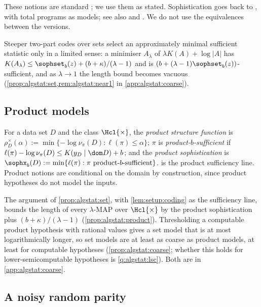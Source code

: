 These notions are standard \citep{gacs2001algorithmic,vereshchagin2004kolmogorov,vereshchagin2017algorithmic}; we use them as stated. Sophistication goes back to \citet{koppel1987complexity,koppel1991almost}, with total programs as models; see also \citet{vitanyi2006meaningful} and \citet{antunes2009sophistication}. We do not use the equivalences between the versions.

Steeper two-part codes over sets select an approximately minimal sufficient statistic only in a limited sense: a minimiser $A_\lambda$ of $\lambda K(A)+\log|A|$ has $K(A_\lambda)\le\sophset_b(z)+(b+\kappa)/(\lambda-1)$ and is $(b+(\lambda-1)\sophset_b(z))$-sufficient, and as $\lambda\to1$ the length bound becomes vacuous (\cref{prop:algstat:set,rem:algstat:near1} in \cref{app:algstat:coarse}).

\subsection{Product models}\label{sec:algstat:product}

\begin{definition}\label{def:algstat:product}
For a data set $D$ and the class $\Hcl{\times}$, the \emph{product structure function} is $\rho^\times_D(\alpha):=\min\{-\log\nu_\pi(D):\ell(\pi)\le\alpha\}$; $\pi$ is \emph{product-$b$-sufficient} if $\ell(\pi)-\log\nu_\pi(D)\le K(y_D\mid\dom D)+b$; and the \emph{product sophistication} is $\sophx_b(D):=\min\{\ell(\pi):\pi\text{ product-$b$-sufficient}\}$.  is the product sufficiency line. Product notions are conditional on the domain by construction, since product hypotheses do not model the inputs.
\end{definition}

The argument of \cref{prop:algstat:set}, with \cref{lem:setup:coding} as the sufficiency line, bounds the length of every $\lambda$-MAP over $\Hcl{\times}$ by the product sophistication plus $(b+\kappa)/(\lambda-1)$ (\cref{prop:algstat:product}). Thresholding a computable product hypothesis with rational values gives a set model that is at most logarithmically longer, so set models are at least as coarse as product models, at least for computable hypotheses (\cref{prop:algstat:coarse}; whether this holds for lower-semicomputable hypotheses is \cref{q:algstat:lsc}). Both are in \cref{app:algstat:coarse}.

\subsection{A noisy random parity}\label{sec:algstat:parity}

